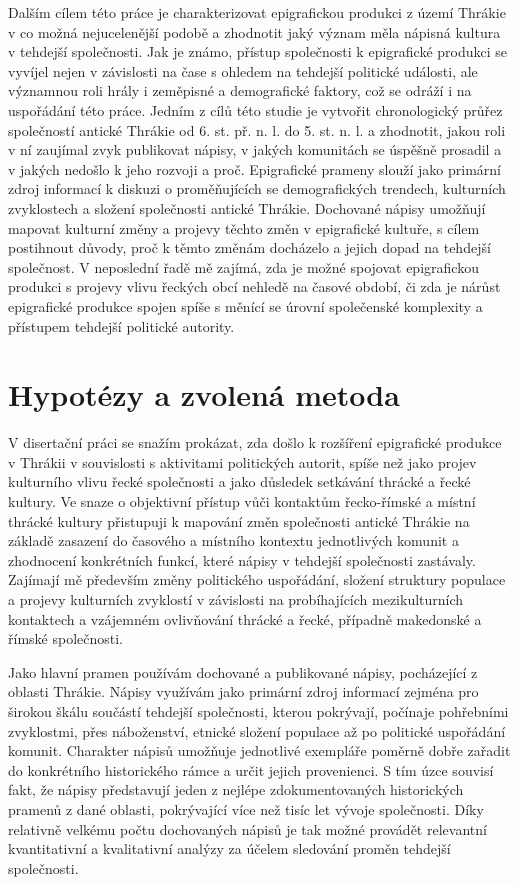 Dalším cílem této práce je charakterizovat epigrafickou produkci z území Thrákie v co možná nejucelenější podobě a zhodnotit jaký význam měla nápisná kultura v tehdejší společnosti. Jak je známo, přístup společnosti k epigrafické produkci se vyvíjel nejen v závislosti na čase s ohledem na tehdejší politické události, ale významnou roli hrály i zeměpisné a demografické faktory, což se odráží i na uspořádání této práce. Jedním z cílů této studie je vytvořit chronologický průřez společností antické Thrákie od 6. st. př. n. l. do 5. st. n. l. a zhodnotit, jakou roli v ní zaujímal zvyk publikovat nápisy, v jakých komunitách se úspěšně prosadil a v jakých nedošlo k jeho rozvoji a proč. Epigrafické prameny slouží jako primární zdroj informací k diskuzi o proměňujících se demografických trendech, kulturních zvyklostech a složení společnosti antické Thrákie. Dochované nápisy umožňují mapovat kulturní změny a projevy těchto změn v epigrafické kultuře, s cílem postihnout důvody, proč k těmto změnám docházelo a jejich dopad na tehdejší společnost. V neposlední řadě mě zajímá, zda je možné spojovat epigrafickou produkci s projevy vlivu řeckých obcí nehledě na časové období, či zda je nárůst epigrafické produkce spojen spíše s měnící se úrovní společenské komplexity a přístupem tehdejší politické autority.

\section[hypotézy-a-zvolená-metoda]{Hypotézy a zvolená metoda}

V disertační práci se snažím prokázat, zda došlo k rozšíření epigrafické produkce v Thrákii v souvislosti s aktivitami politických autorit, spíše než jako projev kulturního vlivu řecké společnosti a jako důsledek setkávání thrácké a řecké kultury. Ve snaze o objektivní přístup vůči kontaktům řecko-římské a místní thrácké kultury přistupuji k mapování změn společnosti antické Thrákie na základě zasazení do časového a místního kontextu jednotlivých komunit a zhodnocení konkrétních funkcí, které nápisy v tehdejší společnosti zastávaly. Zajímají mě především změny politického uspořádání, složení struktury populace a projevy kulturních zvyklostí v závislosti na probíhajících mezikulturních kontaktech a vzájemném ovlivňování thrácké a řecké, případně makedonské a římské společnosti.

Jako hlavní pramen používám dochované a publikované nápisy, pocházející z oblasti Thrákie. Nápisy využívám jako primární zdroj informací zejména pro širokou škálu součástí tehdejší společnosti, kterou pokrývají, počínaje pohřebními zvyklostmi, přes náboženství, etnické složení populace až po politické uspořádání komunit. Charakter nápisů umožňuje jednotlivé exempláře poměrně dobře zařadit do konkrétního historického rámce a určit jejich provenienci. S tím úzce souvisí fakt, že nápisy představují jeden z nejlépe zdokumentovaných historických pramenů z dané oblasti, pokrývající více než tisíc let vývoje společnosti. Díky relativně velkému počtu dochovaných nápisů je tak možné provádět relevantní kvantitativní a kvalitativní analýzy za účelem sledování proměn tehdejší společnosti.

